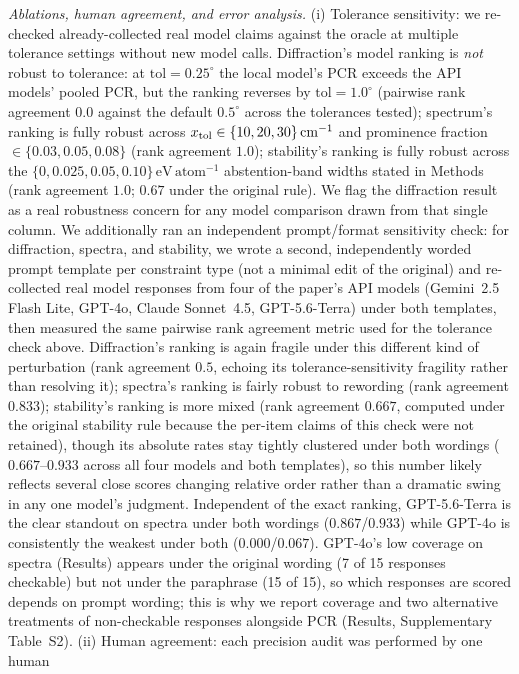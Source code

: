 \documentclass[pdflatex,sn-nature]{sn-jnl}
\newcommand{\rev}[1]{#1}
\newcommand{\rev}[1]{{\color{blue}#1}}
\begin{document}
\noindent\emph{Ablations, human agreement, and error analysis.} (i) Tolerance sensitivity:
we re-checked already-collected real model claims against the oracle at multiple tolerance
settings without new model calls. Diffraction's model ranking is \emph{not} robust to
tolerance: at $\mathrm{tol}=0.25^\circ$ the local model's PCR exceeds the API models'
pooled PCR, but the ranking reverses by $\mathrm{tol}=1.0^\circ$ (pairwise rank agreement
$0.0$ against the default $0.5^\circ$ across the tolerances tested); spectrum's ranking is
fully robust across $x_{\rm tol}\in\{10,20,30\}\,\mathrm{cm}^{-1}$ and prominence fraction
$\in\{0.03,0.05,0.08\}$ (rank agreement $1.0$); stability's ranking is \rev{fully robust across the
$\{0,0.025,0.05,0.10\}\,\mathrm{eV\,atom^{-1}}$ abstention-band widths stated in Methods (rank agreement
$1.0$; $0.67$ under the original rule)}. We flag the diffraction result as a real robustness concern
for any model comparison drawn from that single column. We additionally ran an independent
prompt/format sensitivity check: for diffraction, spectra, and stability, we wrote a second,
independently worded prompt template per constraint type (not a minimal edit of the
original) and re-collected real model responses from four of the paper's API models
(Gemini~2.5 Flash Lite, GPT-4o, Claude Sonnet~4.5, GPT-5.6-Terra) under both templates, then
measured the same pairwise rank agreement metric used for the tolerance check above.
Diffraction's ranking is again fragile under this different kind of perturbation (rank
agreement $0.5$, echoing its tolerance-sensitivity fragility rather than resolving it);
spectra's ranking is fairly robust to rewording (rank agreement $0.833$); stability's ranking
is more mixed (rank agreement $0.667$\rev{, computed under the original stability rule because the per-item
claims of this check were not retained}), though its absolute rates stay tightly clustered
under both wordings ($0.667$--$0.933$ across all four models and both templates), so this
number likely reflects several close scores changing relative order rather than a dramatic
swing in any one model's judgment. Independent of the exact ranking, GPT-5.6-Terra is the
clear standout on spectra under both wordings ($0.867$/$0.933$) while GPT-4o is consistently
the weakest under both ($0.000$/$0.067$). \rev{GPT-4o's low coverage on spectra (Results) appears under the
original wording (7 of 15 responses checkable) but not under the paraphrase (15 of 15), so which
responses are scored depends on prompt wording; this is why we report coverage and two alternative
treatments of non-checkable responses alongside PCR (Results, Supplementary Table~S2).} (ii) Human agreement: each precision audit was performed by one human
\end{document}
